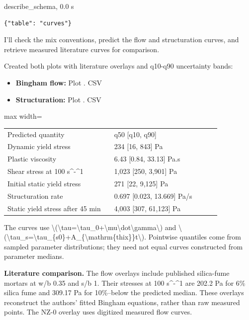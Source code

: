 \begin{toolbox}{describe\_schema, 0.0 s}
\begin{lstlisting}[style=argstyle]
{"table": "curves"}
\end{lstlisting}
\end{toolbox}
\begin{agentbox}
I'll check the mix conventions, predict the flow and structuration curves, and retrieve measured literature curves for comparison.\par
Created both plots with literature overlays and q10-q90 uncertainty bands:\par
\par
\begin{itemize}[nosep,leftmargin=1.2em]
\item \textbf{Bingham flow:} Plot . CSV
\item \textbf{Structuration:} Plot . CSV
\end{itemize}
\par\smallskip\begin{adjustbox}{max width=\linewidth}\begin{tabular}{p{0.47\linewidth}p{0.47\linewidth}}
Predicted quantity & q50 [q10, q90] \\
Dynamic yield stress & 234 [16, 843] Pa \\
Plastic viscosity & 6.43 [0.84, 33.13] Pa.s \\
Shear stress at 100 s\textasciicircum{}-\textasciicircum{}1 & 1,023 [250, 3,901] Pa \\
Initial static yield stress & 271 [22, 9,125] Pa \\
Structuration rate & 0.697 [0.023, 13.669] Pa/s \\
Static yield stress after 45 min & 4,003 [307, 61,123] Pa \\
\end{tabular}\end{adjustbox}\par\smallskip
\par
The curves use \textbackslash{}(\textbackslash{}tau=\textbackslash{}tau\_0+\textbackslash{}mu\textbackslash{}dot\textbackslash{}gamma\textbackslash{}) and \textbackslash{}(\textbackslash{}tau\_s=\textbackslash{}tau\_\{s0\}+A\_\{\textbackslash{}mathrm\{thix\}\}t\textbackslash{}). Pointwise quantiles come from sampled parameter distributions; they need not equal curves constructed from parameter medians.\par
\par
\textbf{Literature comparison.} The flow overlays include published silica-fume mortars at w/b 0.35 and s/b 1. Their stresses at 100 s\textasciicircum{}-\textasciicircum{}1 are 202.2 Pa for 6\% silica fume and 309.17 Pa for 10\%--below the predicted median. These overlays reconstruct the authors' fitted Bingham equations, rather than raw measured points. The NZ-0 overlay uses digitized measured flow curves.\par

\end{agentbox}
